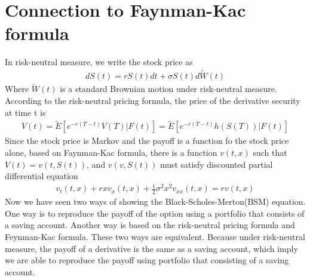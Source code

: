 \documentclass[a4paper]{article}
\begin{document}
\section{Connection to Faynman-Kac formula}
In risk-neutral measure, we write the stock price as
\begin{align*}
	dS(t) = rS(t) dt + \sigma S(t) d \tilde W(t) 
\end{align*}
Where $\tilde W(t)$ is a standard Brownian motion under risk-neutral measure.\\
According to the risk-neutral pricing formula, the price of the derivative security at time t is
\begin{align}
	V(t) = \tilde E[e^{-r(T-t)}V(T)| F(t)] = \tilde E[e^{-r(T-t)}h(S(T))| F(t)] \label{rn}
\end{align}
Since the stock price is Markov and the payoff is a function fo the stock price alone, based on Faynman-Kac formula, there is a function $v(t,x)$ such that $V(t) = v(t, S(t))$, and $v(v, S(t))$ must satisfy discounted partial differential equation 
\begin{align*}
	v_t(t,x) + rx v_x(t,x) + \frac{1}{2} \sigma^2 x^2 v_{xx}(t,x) = rv(t,x)
\end{align*}
Now we have seen two ways of showing the Black-Scholes-Merton(BSM) equation. 
One way is to reproduce the payoff of the option using a portfolio that consists of a 
saving account. Another way is based on the risk-neutral pricing formula and Feynman-Kac formula. 
These two ways are equivalent. Because under risk-neutral measure, the payoff of a derivative is the same as a saving account, which imply we are able to reproduce the payoff using portfolio that consisting of a saving account.
\end{document}

